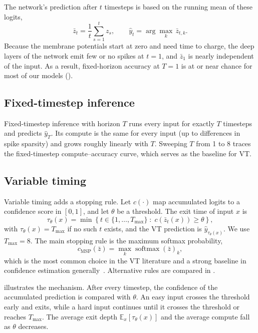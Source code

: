 The network's prediction after $t$ timesteps is based on the running mean of these logits,
\begin{equation}
    \bar{z}_t = \frac{1}{t} \sum_{s=1}^{t} z_s, \qquad \hat{y}_t = \arg\max_{k} \, \bar{z}_{t,k}.
    \label{eq:accum}
\end{equation}
Because the membrane potentials start at zero and need time to charge, the deep layers of the network emit few or no spikes at $t = 1$, and $\bar{z}_1$ is nearly independent of the input. As a result, fixed-horizon accuracy at $T = 1$ is at or near chance for most of our models ().

\subsection{Fixed-timestep inference}

Fixed-timestep inference with horizon $T$ runs every input for exactly $T$ timesteps and predicts $\hat{y}_T$. Its compute is the same for every input (up to differences in spike sparsity) and grows roughly linearly with $T$. Sweeping $T$ from 1 to 8 traces the fixed-timestep compute--accuracy curve, which serves as the baseline for VT.

\subsection{Variable timing}

Variable timing adds a stopping rule. Let $c(\cdot)$ map accumulated logits to a confidence score in $[0, 1]$, and let $\theta$ be a threshold. The exit time of input $x$ is
\begin{equation}
    \tau_\theta(x) = \min\left\{ t \in \{1, \dots, T_{\max}\} \;:\; c\left(\bar{z}_t(x)\right) \geq \theta \right\},
    \label{eq:exit}
\end{equation}
with $\tau_\theta(x) = T_{\max}$ if no such $t$ exists, and the VT prediction is $\hat{y}_{\tau_\theta(x)}$. We use $T_{\max} = 8$. The main stopping rule is the maximum softmax probability,
\begin{equation}
    c_{\mathrm{MSP}}(\bar{z}) = \max_{k} \operatorname{softmax}(\bar{z})_k,
    \label{eq:msp}
\end{equation}
which is the most common choice in the VT literature and a strong baseline in confidence estimation generally~\cite{hendrycks2017baseline}. Alternative rules are compared in .

 illustrates the mechanism. After every timestep, the confidence of the accumulated prediction is compared with $\theta$. An easy input crosses the threshold early and exits, while a hard input continues until it crosses the threshold or reaches $T_{\max}$. The average exit depth $\mathbb{E}_x[\tau_\theta(x)]$ and the average compute fall as $\theta$ decreases.

